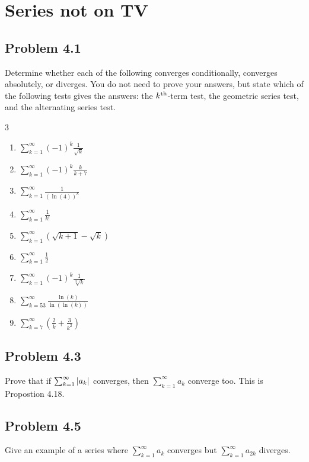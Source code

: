\documentclass[12pt]{report}
\begin{document}
\chapter{Series not on TV}

\section{Problem 4.1}
    Determine whether each of the following converges conditionally, converges absolutely, or diverges. 
    You do not need  to prove your answers, but state which of the following tests gives the answers: the $k^{\rm th}$-term test, the geometric series test, and the alternating series test.
    \begin{multicols}{3}
        \begin{enumerate}[label=(\alph*)]
            \item   $\sum_{k = 1}^{\infty}  (-1)^k \frac{1}{\sqrt{k}}$
            \item   $\sum_{k = 1}^{\infty}  (-1)^k \frac{k}{k + 7}$
            \item   $\sum_{k = 1}^{\infty}  \frac{1}{(\ln(4))^k}$
            \item   $\sum_{k = 1}^{\infty}  \frac{1}{k!}$
            \item   {\scriptsize $\sum_{k = 1}^{\infty}  (\sqrt{k + 1} - \sqrt{k})$}
            \item   $\sum_{k = 1}^{\infty}  \frac{1}{2}$
            \item   $\sum_{k = 1}^{\infty}  (-1)^k \frac{1}{\sqrt[3]{k}}$
            \item   $\sum_{k = 53}^{\infty} \frac{\ln(k)}{\ln(\ln(k))}$
            \item   $\sum_{k = 7}^{\infty}  \left( \frac{2}{k} + \frac{3}{k^2} \right)$
        \end{enumerate}
    \end{multicols}

\section{Problem 4.3}
    Prove that if $\sum_{k = 1}^{\infty} \left| a_k \right|$ converges, then $\sum_{k = 1}^{\infty} a_k$ converge too.
    This is Propostion 4.18.

\section{Problem 4.5}
    Give an example of a series where $\sum_{k = 1}^{\infty} a_k$ converges but $\sum_{k = 1}^{\infty} a_{2k}$ diverges.
\end{document}

